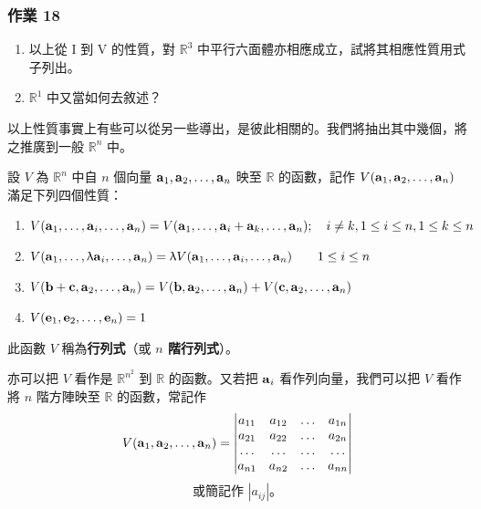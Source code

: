 \subsubsection*{作業 18}\label{hw:b6s-1-18}
\begin{enumerate}[label=(\roman*), leftmargin=2em]
  \item 以上從 I 到 V 的性質，對 $\mathbb{R}^3$ 中平行六面體亦相應成立，試將其相應性質用式子列出。
  \item $\mathbb{R}^1$ 中又當如何去敘述？
\end{enumerate}

以上性質事實上有些可以從另一些導出，是彼此相關的。我們將抽出其中幾個，將之推廣到一般 $\mathbb{R}^n$ 中。

\begin{definition}\label{def:b6s-1-5}
設 $V$ 為 $\mathbb{R}^n$ 中自 $n$ 個向量 $\boldsymbol{\mathbf{a}}_1, \boldsymbol{\mathbf{a}}_2, \dots, \boldsymbol{\mathbf{a}}_n$ 映至 $\mathbb{R}$ 的函數，記作 $V(\boldsymbol{\mathbf{a}}_1, \boldsymbol{\mathbf{a}}_2, \dots, \boldsymbol{\mathbf{a}}_n)$ 滿足下列四個性質：
\begin{enumerate}[label=(\Alph*), leftmargin=2em]
  \item $V(\boldsymbol{\mathbf{a}}_1, \dots, \boldsymbol{\mathbf{a}}_i, \dots, \boldsymbol{\mathbf{a}}_n) = V(\boldsymbol{\mathbf{a}}_1, \dots, \boldsymbol{\mathbf{a}}_i + \boldsymbol{\mathbf{a}}_k, \dots, \boldsymbol{\mathbf{a}}_n); \quad i \ne k, 1 \le i \le n, 1 \le k \le n$
  \item $V(\boldsymbol{\mathbf{a}}_1, \dots, \uplambda\boldsymbol{\mathbf{a}}_i, \dots, \boldsymbol{\mathbf{a}}_n) = \uplambda V(\boldsymbol{\mathbf{a}}_1, \dots, \boldsymbol{\mathbf{a}}_i, \dots, \boldsymbol{\mathbf{a}}_n) \qquad 1 \le i \le n$
  \item $V(\boldsymbol{\mathbf{b}} + \boldsymbol{\mathbf{c}}, \boldsymbol{\mathbf{a}}_2, \dots, \boldsymbol{\mathbf{a}}_n) = V(\boldsymbol{\mathbf{b}}, \boldsymbol{\mathbf{a}}_2, \dots, \boldsymbol{\mathbf{a}}_n) + V(\boldsymbol{\mathbf{c}}, \boldsymbol{\mathbf{a}}_2, \dots, \boldsymbol{\mathbf{a}}_n)$
  \item $V(\boldsymbol{\mathbf{e}}_1, \boldsymbol{\mathbf{e}}_2, \dots, \boldsymbol{\mathbf{e}}_n) = 1$
\end{enumerate}
此函數 $V$ 稱為\textbf{行列式}（或 \textbf{$n$ 階行列式}）。
\end{definition}

亦可以把 $V$ 看作是 $\mathbb{R}^{n^2}$ 到 $\mathbb{R}$ 的函數。又若把 $\boldsymbol{\mathbf{a}}_i$ 看作列向量，我們可以把 $V$ 看作將 $n$ 階方陣映至 $\mathbb{R}$ 的函數，常記作
\begin{equation}
V(\boldsymbol{\mathbf{a}}_1, \boldsymbol{\mathbf{a}}_2, \dots, \boldsymbol{\mathbf{a}}_n) = \begin{vmatrix}
a_{11} & a_{12} & \dots & a_{1n} \\
a_{21} & a_{22} & \dots & a_{2n} \\
\dots & \dots & \dots & \dots \\
a_{n1} & a_{n2} & \dots & a_{nn}
\end{vmatrix} \label{eq:b6s-1-2-4}
\end{equation}
\begin{equation}
\text{或簡記作 } |a_{ij}|\text{。} \tag{4'} \label{eq:b6s-1-2-4p}
\end{equation}

